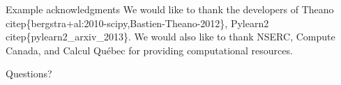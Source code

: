 \documentclass[utf8x]{beamer}
\begin{document}
\begin{frame}{Example acknowledgments}
We would like to thank the developers of
Theano \\citep\{bergstra+al:2010-scipy,Bastien-Theano-2012\},
Pylearn2 \\citep\{pylearn2\_arxiv\_2013\}. We would also like
to thank NSERC, Compute Canada, and Calcul Qu\'ebec
for providing computational resources.
\end{frame}


\begin{frame}
\begin{center}

\Huge
Questions?
\end{center}
\end{frame}
\end{document}

